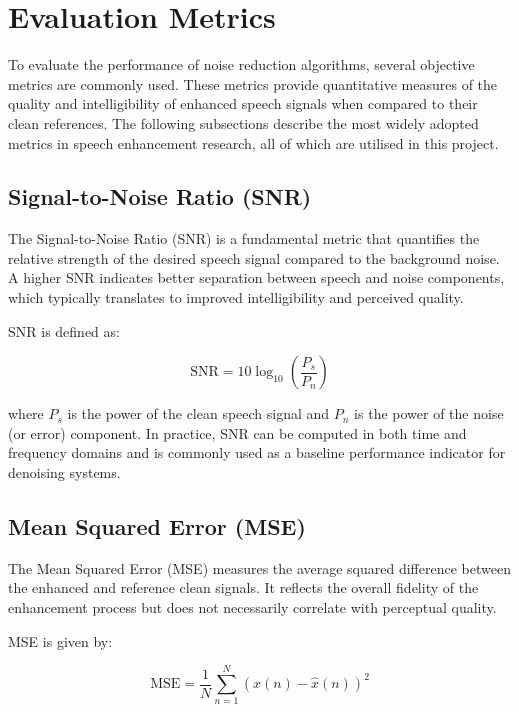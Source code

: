 \section{Evaluation Metrics}
\label{sec:evaluation_metrics}

To evaluate the performance of noise reduction algorithms, several objective metrics are commonly used. These metrics provide quantitative measures of the quality and intelligibility of enhanced speech signals when compared to their clean references. The following subsections describe the most widely adopted metrics in speech enhancement research, all of which are utilised in this project.

\subsection{Signal-to-Noise Ratio (SNR)}
\label{subsec:snr}

The Signal-to-Noise Ratio (SNR) is a fundamental metric that quantifies the relative strength of the desired speech signal compared to the background noise. A higher SNR indicates better separation between speech and noise components, which typically translates to improved intelligibility and perceived quality.

SNR is defined as:

\begin{equation}
    \text{SNR} = 10 \log_{10} \left( \frac{P_s}{P_n} \right)
\end{equation}

where \( P_s \) is the power of the clean speech signal and \( P_n \) is the power of the noise (or error) component. In practice, SNR can be computed in both time and frequency domains and is commonly used as a baseline performance indicator for denoising systems.

\subsection{Mean Squared Error (MSE)}
\label{subsec:mse}

The Mean Squared Error (MSE) measures the average squared difference between the enhanced and reference clean signals. It reflects the overall fidelity of the enhancement process but does not necessarily correlate with perceptual quality.

MSE is given by:

\begin{equation}
    \text{MSE} = \frac{1}{N} \sum_{n=1}^{N} (x(n) - \hat{x}(n))^2
\end{equation}

